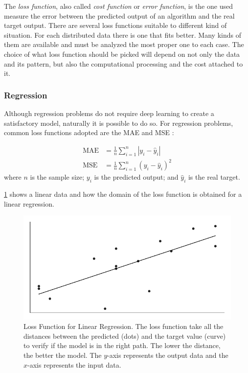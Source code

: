 The \emph{loss function}, also called \emph{cost function} or \emph{error function}, is the one used measure the error between the predicted output of an algorithm and the real target output. 
There are several loss functions suitable to different kind of situation. 
For each distributed data there is one that fits better.
Many kinds of them are available and must be analyzed the most proper one to each case. 
The choice of what loss function should be picked will depend on not only the data and its pattern, but also the computational processing and the cost attached to it.

\subsubsection*{Regression}

Although regression problems do not require deep learning to create a satisfactory model, naturally it is possible to do so.
For regression problems, common loss functions adopted are the MAE and MSE \cite{bussab2017}:

\begin{align}
    \text{MAE} &= \frac{1}{n} \sum_{i=1}^n |y_i - \hat{y}_i| 
    \label{eq:mae} \\
    \text{MSE} &= \frac{1}{n} \sum_{i=1}^n (y_i - \hat{y}_i)^2
    \label{eq:mse}
\end{align}
%
where \(n\) is the sample size; \(y_i\) is the predicted output; and \(\hat{y}_i\) is the real target.

\cref{fig:mae_chart} shows a linear data and how the domain of the loss function is obtained for a linear regression.
%
\begin{figure}[!htb]
    \centering
    \caption[Loss Function for Linear Regression]{Loss Function for Linear Regression. The loss function take all the distances between the predicted (dots) and the target value (curve) to verify if the model is in the right path. The lower the distance, the better the model. The \(y\)-axis represents the output data and the \(x\)-axis represents the input data.}
    \includegraphics{figures/3review/nn/mae_chart.pdf}
    
    \label{fig:mae_chart}
\end{figure}

